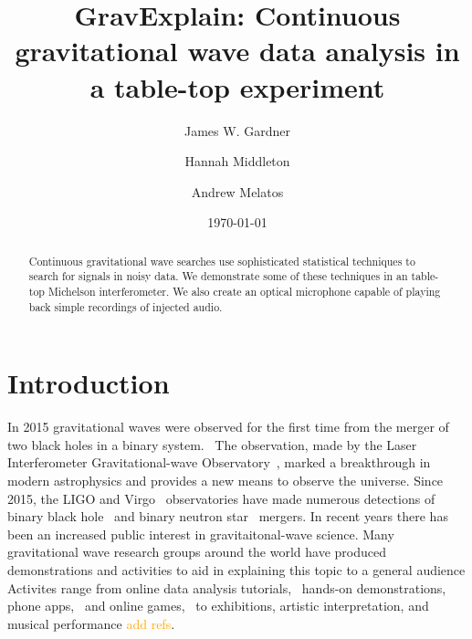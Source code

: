 \documentclass[prb,preprint]{revtex4-1}
\newcommand{\han}{\textcolor{orange}}
\begin{document}
\title{GravExplain: Continuous gravitational wave data analysis in a table-top experiment}

\author{James W. Gardner}

\author{Hannah Middleton}
\author{Andrew Melatos}

\date{\today}

\begin{abstract}
Continuous gravitational wave searches use sophisticated statistical techniques to search for signals in noisy data. We demonstrate some of these techniques in an table-top Michelson interferometer. We also create an optical microphone capable of playing back simple recordings of injected audio.
 
\end{abstract}

\maketitle

\section{Introduction}

In 2015 gravitational waves were observed for the first time from the merger of two black holes in a binary system.~\cite{GW150914} 
The observation, made by the Laser Interferometer Gravitational-wave Observatory~\citep[LIGO]{AdvancedLIGO:2015}, marked a breakthrough in modern astrophysics and provides a new means to observe the universe. 
Since 2015, the LIGO and Virgo~\cite{AdvancedVirgo:2015} observatories have made numerous detections of binary black hole~\cite{GW151226,GW170104,GW170814} and binary neutron star~\cite{GW170817,GW170817multi,GW190425} mergers. 
In recent years there has been an increased public interest in gravitaitonal-wave science. 
Many gravitational wave research groups around the world have produced demonstrations and activities to aid in explaining this topic to a general audience
Activites range from online data analysis tutorials,~\cite{GWOSC:online,LOSC:2015} hands-on demonstrations, phone apps,~\cite{LaserLabs:online,SciVR:online} and online games,~\cite{BlackHoleHunter:online} to exhibitions,\cite{L2URSSE} artistic interpretation, and musical performance \han{add refs}. 
\end{document}
